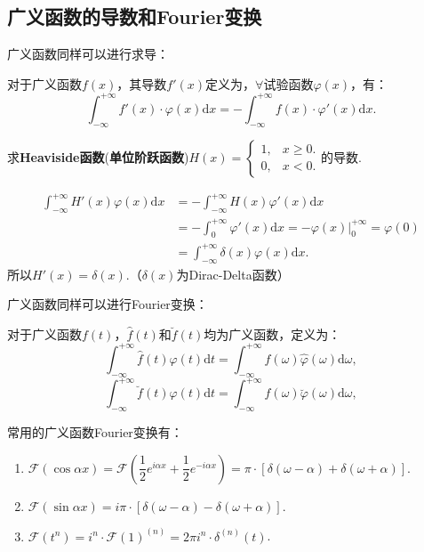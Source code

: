 \documentclass[openany,oneside]{ctexbook}
\begin{document}
\subsection{广义函数的导数和Fourier变换}
广义函数同样可以进行求导：
\begin{definition}
    对于广义函数$f(x)$，其导数$f'(x)$定义为，$\forall$试验函数$\varphi(x)$，有：
    \[\int_{-\infty}^{+\infty}f'(x)\cdot\varphi(x)\mathrm{d}x=-\int_{-\infty}^{+\infty}f(x)\cdot\varphi'(x)\mathrm{d}x.\]
\end{definition}
\begin{example}
    求\textbf{Heaviside函数}(\textbf{单位阶跃函数})$H(x)=\begin{cases}
        1,&x\geq 0.\\
        0,&x<0.
    \end{cases}$的导数.
\end{example}
\begin{solution}
    \begin{align*}
        \displaystyle\int_{-\infty}^{+\infty}H'(x)\varphi(x)\mathrm{d}x&=-\int_{-\infty}^{+\infty}H(x)\varphi'(x)\mathrm{d}x\\
        &=-\displaystyle\int_0^{+\infty}\varphi'(x)\mathrm{d}x=-\varphi(x)\bigg|_0^{+\infty}=\varphi(0)\\
        &=\displaystyle\int_{-\infty}^{+\infty}\delta(x)\varphi(x)\mathrm{d}x.
    \end{align*}
    所以$H'(x)=\delta(x)$.（$\delta(x)$为Dirac-Delta函数）
\end{solution}

广义函数同样可以进行Fourier变换：
\begin{definition}[广义函数的Fourier变换]
    对于广义函数$f(t)$，$\hat{f}(t)$和$\breve{f}(t)$均为广义函数，定义为：
    \begin{equation}
        \int_{-\infty}^{+\infty}\hat{f}(t)\varphi(t)\mathrm{d}t=\int_{-\infty}^{+\infty}f(\omega)\hat{\varphi}(\omega)\mathrm{d}\omega,
    \end{equation}
    \begin{equation}
        \int_{-\infty}^{+\infty}\breve{f}(t)\varphi(t)\mathrm{d}t=\int_{-\infty}^{+\infty}f(\omega)\breve{\varphi}(\omega)\mathrm{d}\omega,
    \end{equation}
\end{definition}
常用的广义函数Fourier变换有：
\begin{enumerate}[label=(\arabic*), itemsep=1pt]
    \item $\mathcal{F}(\cos\alpha x)=\mathcal{F}(\dfrac{1}{2}e^{i\alpha x}+\dfrac{1}{2}e^{-i\alpha x})=\pi\cdot[\delta(\omega-\alpha)+\delta(\omega+\alpha)]$.
    \item $\mathcal{F}(\sin\alpha x)=i\pi\cdot[\delta(\omega-\alpha)-\delta(\omega+\alpha)]$.
    \item $\mathcal{F}(t^n)=i^n\cdot\mathcal{F}(1)^{(n)}=2\pi i^n\cdot\delta^{(n)}(t)$.
\end{enumerate}
\appendix
\end{document}
